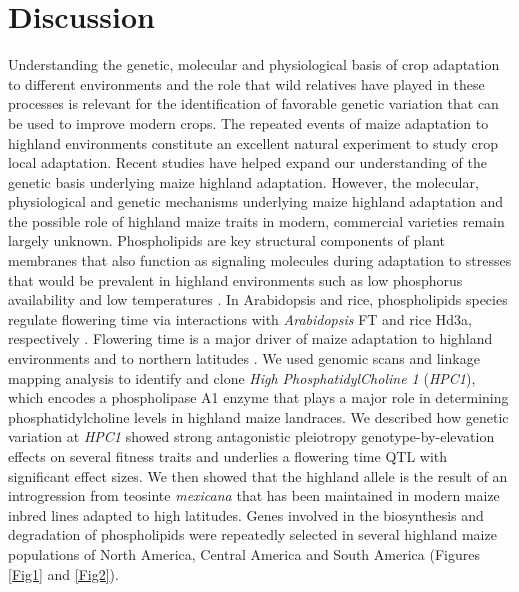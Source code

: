 \documentclass[9pt,twocolumn,twoside,lineno]{biorxiv}
\newcommand{\mex}{\textit{mexicana}\xspace}
\newcommand{\hpc}{\textit{HPC1}\xspace}
\begin{document}
\section{Discussion}
\label{sec:discussion}
Understanding the genetic, molecular and  physiological basis of crop adaptation to different environments and the role that wild relatives have played in these processes is relevant for the identification of favorable genetic variation that can be used to improve modern crops.
The repeated events of maize adaptation to highland environments constitute an excellent natural experiment to study crop local adaptation. 
Recent studies \cite{Wang2020-mp, Takuno2015-uj, Crow2020-gene} have helped expand our understanding of the genetic basis underlying maize highland adaptation. 
However, the molecular, physiological and genetic mechanisms underlying maize highland adaptation and the possible role of highland maize traits in modern, commercial varieties remain largely unknown.
Phospholipids are key structural components of plant membranes that also function as signaling molecules during adaptation to stresses that would be prevalent in highland environments \cite{Ryu2004-iv, Nakamura2017-vb} such as low phosphorus availability \cite{Veneklaas2012-ls, Cruz-Ramirez2004-ib, Lambers2012-an} and low temperatures \cite{Degenkolbe2012-wf, Welti2002-uk, Marla2017-ph}. 
In Arabidopsis and rice, phospholipids species regulate flowering time via interactions with \textit{Arabidopsis} FT and rice Hd3a, respectively \cite{Nakamura2014-qf, Susila2021-dz, Qu2021-wc}. 
Flowering time is a major driver of maize adaptation to highland environments \cite{Romero_Navarro2017-cn, Gates2019-xu, Mercer2019-vj} and to northern latitudes \cite{Hung2012-ms, Swarts2017-ge}.
We used genomic scans and linkage mapping analysis to identify and clone \textit{High PhosphatidylCholine 1} (\hpc), which encodes a phospholipase A1 enzyme that plays a major role in determining phosphatidylcholine levels in highland maize landraces.
We described how genetic variation at \hpc showed strong antagonistic pleiotropy  genotype-by-elevation effects on several fitness traits and underlies a flowering time QTL with significant effect sizes.
We then showed that the highland allele is the result of an introgression from teosinte \mex that has been maintained in modern maize inbred lines adapted to high latitudes.
Genes involved in the biosynthesis and degradation of phospholipids were repeatedly selected in several highland maize populations of North America, Central America and South America (Figures \cref{Fig1} and \cref{Fig2}). 
\end{document}
